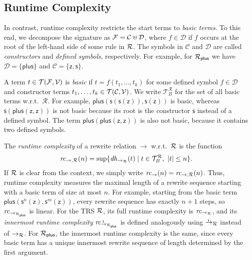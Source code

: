 \subsection{Runtime Complexity}

In contrast, runtime complexity restricts the start terms to \emph{basic terms}.
To this end, we decompose the signature as $\mathcal{F} = \mathcal{C} \uplus \mathcal{D}$, 
where $f \in \mathcal{D}$ if $f$ occurs at the root of the left-hand side of some rule in $\mathcal{R}$.
The symbols in $\mathcal{C}$ and $\mathcal{D}$ are called \emph{constructors} and \emph{defined symbols}, respectively.
For example, for $\mathcal{R}_{\mathsf{plus}}$ we have $\mathcal{D} = \{\mathsf{plus}\}$ and $\mathcal{C} = \{\mathsf{z},\mathsf{s}\}$.

A term $t \in \mathcal{T}(\mathcal{F},\mathcal{V})$ is \emph{basic} if $t = f(t_1,\ldots,t_k)$ 
for some defined symbol $f \in \mathcal{D}$ and constructor terms $t_1,\ldots,t_k \in \mathcal{T}(\mathcal{C},\mathcal{V})$.
We write $\mathcal{T}_{\mathit{B}}^{\mathcal{R}}$ for the set of all basic terms w.r.t.\ $\mathcal{R}$.
For example, $\mathsf{plus}(\mathsf{s}(\mathsf{s}(\mathsf{z})),\mathsf{s}(\mathsf{z}))$ is basic, 
whereas $\mathsf{s}(\mathsf{plus}(\mathsf{z},\mathsf{z}))$ is not basic because its root is the constructor $\mathsf{s}$ instead of a defined symbol.
The term $\mathsf{plus}(\mathsf{plus}(\mathsf{z},\mathsf{z}))$ is also not basic, because it contains two defined symbols.

The \emph{runtime complexity} of a rewrite relation $\to$ w.r.t.\ $\mathcal{R}$ is the function
\[
  \mathit{rc}_{\to,\mathcal{R}}(n) = \sup\{ \mathit{dh}_{\to_{\mathcal{R}}}(t) \mid t \in \mathcal{T}_{\mathit{B}}^{\mathcal{R}},\ |t| \leq n \}.
\]
If $\mathcal{R}$ is clear from the context, we simply write $\mathit{rc}_{\to}(n) = \mathit{rc}_{\to,\mathcal{R}}(n)$.
Thus, runtime complexity measures the maximal length of a rewrite sequence starting with a basic term of size at most $n$.
For example, starting from the basic term $\mathsf{plus}(\mathsf{s}^n(\mathsf{z}),\mathsf{s}^m(\mathsf{z}))$, 
every rewrite sequence has exactly $n+1$ steps, so $\mathit{rc}_{\to_{\mathcal{R}_{\mathsf{plus}}}}$ is linear.
For the TRS $\mathcal{R}$, its full runtime complexity is $\mathit{rc}_{\to_{\mathcal{R}}}$, 
and its \emph{innermost runtime complexity} $\mathit{rc}_{\ito_{\Rules_{\mathsf{plus}}}}$ 
is defined analogously using $\ito_\Rules$ instead of $\to_{\mathcal{R}}$.
For $\mathcal{R}_{\mathsf{plus}}$, the innermost runtime complexity is the same, 
since every basic term has a unique innermost rewrite sequence of length determined by the first argument.

